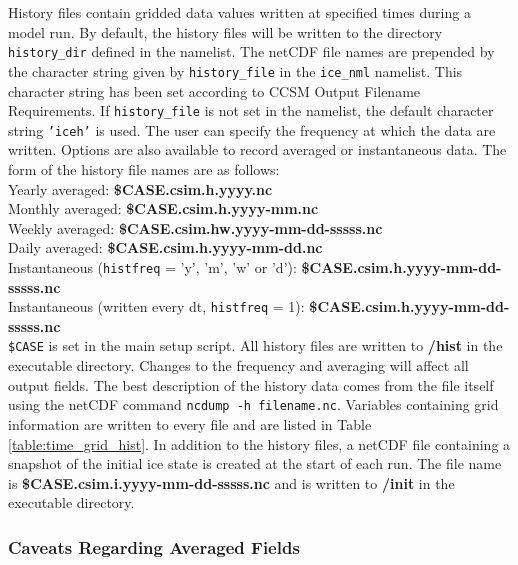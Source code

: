 
History files contain gridded data values written at specified times
during a model run.  By default, the history files will be written to
the directory {\tt history\_dir} defined in the namelist. 
The netCDF file names are prepended by the character
string given by {\tt history\_file} in the {\tt ice\_nml} namelist.
This character string has been set according to CCSM Output Filename Requirements.
If {\tt history\_file} is not set in the namelist, the default character string
{\tt 'iceh'} is used. The user can specify the frequency at which the data
are written. Options are also available to record averaged or instantaneous data.
The form of the history file names are as follows: \\

\noindent Yearly averaged:  {\bf \$CASE.csim.h.yyyy.nc} \\
Monthly averaged: {\bf \$CASE.csim.h.yyyy-mm.nc} \\
Weekly averaged: {\bf \$CASE.csim.hw.yyyy-mm-dd-sssss.nc} \\
Daily averaged: {\bf \$CASE.csim.h.yyyy-mm-dd.nc} \\
Instantaneous ({\tt histfreq} = 'y', 'm', 'w' or 'd'): {\bf \$CASE.csim.h.yyyy-mm-dd-sssss.nc} \\
Instantaneous (written every dt, {\tt histfreq} = 1): {\bf \$CASE.csim.h.yyyy-mm-dd-sssss.nc} \\

{\tt \$CASE} is set in the main setup script. All history files are written
to {\bf /hist} in the executable directory.  Changes to the frequency and
averaging will affect all output fields.  The best description
of the history data comes from the file itself using the netCDF command
{\tt ncdump -h filename.nc}.  Variables containing grid information are
written to every file and are listed in Table \ref{table:time_grid_hist}.
In addition to the history files, a netCDF file containing a snapshot
of the initial ice state is created at the start of each run.  The file
name is {\bf \$CASE.csim.i.yyyy-mm-dd-sssss.nc} and is written to 
{\bf /init} in the executable directory.

\subsubsection{Caveats Regarding Averaged Fields} 
\label{avg_fields}

